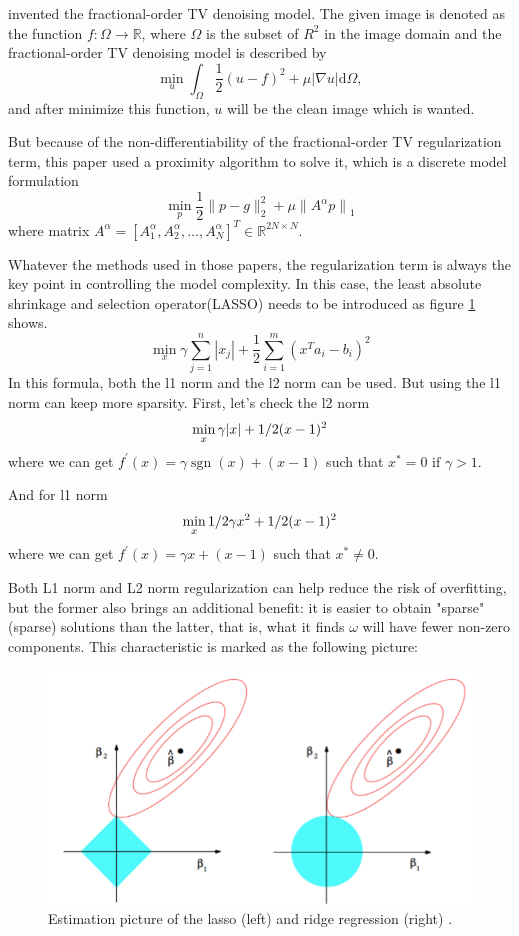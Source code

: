 \documentclass{article}
\begin{document}
\citet{Chen2015} invented the fractional-order TV denoising model. The given image is denoted as the function $f: \Omega \rightarrow \mathbb{R}$, where $\Omega$ is the subset of $R^2$ in the image domain and the fractional-order TV denoising model is described by
$$
\min _{u} \int_{\Omega} \frac{1}{2}(u-f)^{2}+\mu|\nabla u| \mathrm{d} \Omega,
$$
and after minimize this function, $u$ will be the clean image which is  wanted.

But because of the non-differentiability of the fractional-order TV regularization term, this paper used a proximity algorithm to solve it, which is a discrete model formulation
$$
\min _{p} \frac{1}{2}\|p-g\|_{2}^{2}+\mu\left\|A^{\alpha} p\right\|_{1}
$$
where matrix $A^{\alpha}=\left[A_{1}^{\alpha}, A_{2}^{\alpha}, \ldots, A_{N}^{\alpha}\right]^{T} \in \mathbb{R}^{2 N \times N}$.

Whatever the methods used in those papers, the regularization term is always the key point in controlling the model complexity. In this case, the least absolute shrinkage and selection operator(LASSO) needs to be introduced as figure \ref{img4} shows.
$$
\min _{x} \gamma \sum_{j=1}^{n}\left|x_{j}\right|+\frac{1}{2} \sum_{i=1}^{m}\left(x^{T} a_{i}-b_{i}\right)^{2}
$$
In this formula, both the l1 norm and the l2 norm can be used. But using the l1 norm can keep more sparsity. First, let’s check the l2 norm
$$
\min _{x} \gamma|x|+1 / 2(x-1)^{2} \\
$$
where we can get $f^{\prime}(x)=\gamma \operatorname{sgn}(x)+(x-1)$ such that $ x^{*}=0 \text { if } \gamma>1$.

And for l1 norm 
$$
\min _{x} 1 / 2 \gamma x^{2}+1 / 2(x-1)^{2} \\
$$
where we can get $f^{\prime}(x)=\gamma x+(x-1) $ such that $x^{*} \neq 0$.

Both L1 norm and L2 norm regularization can help reduce the risk of overfitting, but the former also brings an additional benefit: it is easier to obtain "sparse" (sparse) solutions than the latter, that is, what it finds $\omega$ will have fewer non-zero components. This characteristic is marked as the following picture:

\begin{figure}[h]
  \includegraphics[width=5in]{pic4.png}
  \centering
  \caption{Estimation picture of the lasso (left) and ridge regression (right) \citep{Friedman2001}.}
  \label{img4}
\end{figure}
\end{document}
